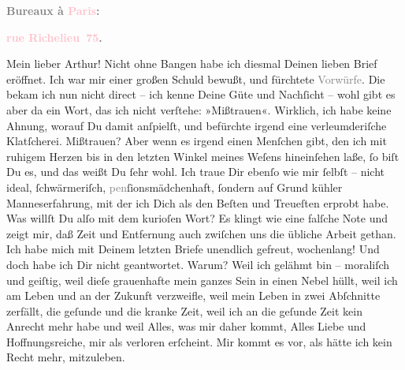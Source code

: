            \begin{otherlanguage}{french}\textcolor{gray}{\textbf{\textbf{Bureaux à \textcolor{pink}{Paris}{}\ledrightnote{\textcolor{pink}{Paris}}:}}}\end{otherlanguage}\pend
           \pstart
           \begin{otherlanguage}{french}\textcolor{gray}{\textbf{\textbf{\textcolor{pink}{rue Richelieu 75}{}\ledrightnote{\textcolor{pink}{rue Richelieu}}.}}}\end{otherlanguage}\pend
           \pstart
           Mein lieber Arthur!\pend
           \pstart
           Nicht ohne Bangen habe ich diesmal Deinen lieben Brief eröffnet. Ich war mir einer
               großen Schuld bewußt, und fürchtete \textcolor{gray}{Vorwürfe}. Die bekam ich nun
               nicht direct – ich kenne Deine Güte und Nachſicht – wohl gibt es aber da ein Wort,
               das ich nicht verſtehe: »Mißtrauen«. Wirklich, ich habe keine Ahnung, worauf Du damit
               anſpielſt, und befürchte irgend eine verleumderiſche Klatſcherei. Mißtrauen? Aber
               wenn es irgend einen Menſchen gibt, den ich mit ruhigem Herzen bis in den letzten
               Winkel meines Weſens hineinſehen laße, ſo {\pb}biſt Du
               es, und das weißt Du ſehr wohl. Ich traue Dir ebenſo wie mir ſelbſt – nicht ideal,
               ſchwärmeriſch, \textcolor{gray}{pen}ſionsmädchenhaft, ſondern auf Grund kühler
               Manneserfahrung, mit der ich Dich als den Beſten und Treueſten erprobt habe. Was
               willſt Du alſo mit dem kurioſen Wort? Es klingt wie eine falſche Note und zeigt mir,
               daß Zeit und Entfernung auch zwiſchen uns die übliche Arbeit gethan.\pend
           \pstart
           Ich habe mich mit Deinem letzten Briefe unendlich gefreut, wochenlang! Und doch habe
               ich Dir nicht geantwortet. Warum? Weil ich gelähmt bin – moraliſch und geiſtig, weil
                  dieſe grauenhafte \label{K_L02711-1v}\label{K_L02711-1h} mein ganzes Sein in einen Nebel hüllt, weil ich am Leben und an der Zukunft
               verzweifle, weil mein Leben {\pb}in zwei Abſchnitte
               zerfällt, die geſunde und die kranke Zeit, weil ich an die geſunde Zeit kein Anrecht
               mehr habe und weil Alles, was mir daher kommt, Alles Liebe und Hoffnungsreiche, mir
               als verloren erſcheint. Mir kommt es vor, als hätte ich kein Recht mehr, mitzuleben.
